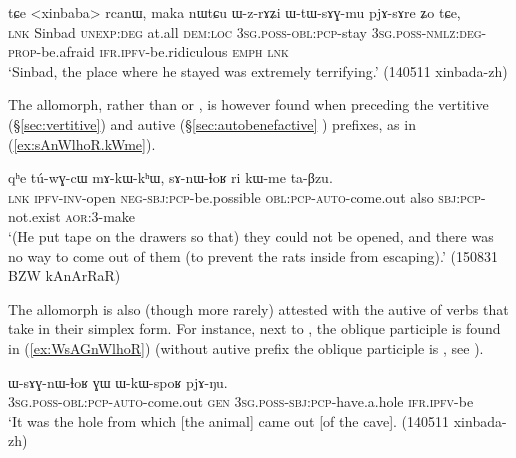 \begin{exe}
\ex \label{ex:WzrAZi}
\gll tɕe <xinbaba> rcanɯ, maka nɯtɕu ɯ-z-rɤʑi ɯ-tɯ-sɤɣ-mu pjɤ-sɤre ʑo tɕe,\\
\textsc{lnk} Sinbad \textsc{unexp}:\textsc{deg} at.all \textsc{dem}:\textsc{loc} \textsc{3sg}.\textsc{poss}-\textsc{obl}:\textsc{pcp}-stay \textsc{3sg}.\textsc{poss}-\textsc{nmlz}:\textsc{deg}-\textsc{prop}-be.afraid \textsc{ifr}.\textsc{ipfv}-be.ridiculous \textsc{emph} \textsc{lnk}\\
\glt `Sinbad, the place where he stayed was extremely terrifying.' (140511 xinbada-zh)
\end{exe}

The  allomorph, rather than  or , is however found when preceding the vertitive (§\ref{sec:vertitive}) and autive (§\ref{sec:autobenefactive} ) prefixes, as in (\ref{ex:sAnWlhoR.kWme}).

\begin{exe}
\ex \label{ex:sAnWlhoR.kWme}
\gll  qʰe tú-wɣ-cɯ mɤ-kɯ-kʰɯ, sɤ-nɯ-ɬoʁ ri kɯ-me ta-βzu. \\
\textsc{lnk} \textsc{ipfv}-\textsc{inv}-open \textsc{neg}-\textsc{sbj}:\textsc{pcp}-be.possible \textsc{obl}:\textsc{pcp}-\textsc{auto}-come.out also \textsc{sbj}:\textsc{pcp}-not.exist \textsc{aor}:3\flobv{}-make \\
\glt `(He put tape on the drawers so that) they could not be opened, and there was no way to come out of them (to prevent the rats inside from escaping).' (150831 BZW kAnArRaR)
\end{exe}

The allomorph  is also (though more rarely) attested with the autive  of verbs that take  in their simplex form. For instance, next to , the oblique participle  is found in (\ref{ex:WsAGnWlhoR}) (without autive prefix the oblique participle is , see ).

\begin{exe}
\ex \label{ex:WsAGnWlhoR}
\gll ɯ-sɤɣ-nɯ-ɬoʁ ɣɯ ɯ-kɯ-spoʁ pjɤ-ŋu.  \\
\textsc{3sg}.\textsc{poss}-\textsc{obl}:\textsc{pcp}-\textsc{auto}-come.out \textsc{gen} \textsc{3sg}.\textsc{poss}-\textsc{sbj}:\textsc{pcp}-have.a.hole \textsc{ifr}.\textsc{ipfv}-be \\
\glt `It was the hole from which [the animal] came out [of the cave].  (140511 xinbada-zh) 
\end{exe} 

